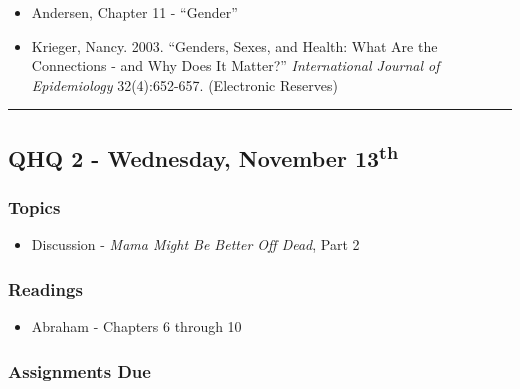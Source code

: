\documentclass[]{book}
\providecommand{\tightlist}{%
  \setlength{\itemsep}{0pt}\setlength{\parskip}{0pt}}
\begin{document}
\begin{itemize}
\tightlist
\item
  Andersen, Chapter 11 - ``Gender''
\item
  Krieger, Nancy. 2003. ``Genders, Sexes, and Health: What Are the Connections - and Why Does It Matter?'' \emph{International Journal of Epidemiology} 32(4):652-657. (Electronic Reserves)
\end{itemize}

\begin{center}\rule{0.5\linewidth}{\linethickness}\end{center}

\hypertarget{qhq-2---wednesday-november-13th}{%
\subsection*{\texorpdfstring{QHQ 2 - Wednesday, November 13\textsuperscript{th}}{QHQ 2 - Wednesday, November 13th}}\label{qhq-2---wednesday-november-13th}}

\hypertarget{topics-23}{%
\subsubsection*{Topics}\label{topics-23}}

\begin{itemize}
\tightlist
\item
  Discussion - \emph{Mama Might Be Better Off Dead}, Part 2
\end{itemize}

\hypertarget{readings-21}{%
\subsubsection*{Readings}\label{readings-21}}

\begin{itemize}
\tightlist
\item
  Abraham - Chapters 6 through 10
\end{itemize}

\hypertarget{assignments-due-4}{%
\subsubsection*{Assignments Due}\label{assignments-due-4}}
\end{document}
